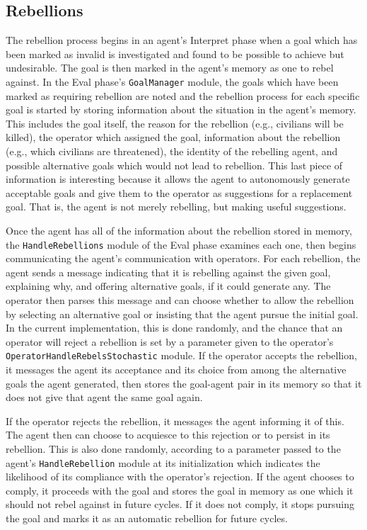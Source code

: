 \documentclass[letterpaper,11pt]{article}
\newcommand{\code}[1]{\texttt{#1}}
\begin{document}
	\subsection{Rebellions}
	The rebellion process begins in an agent's Interpret phase when a goal which has been marked as invalid is investigated and found to be possible to achieve but undesirable. The goal is then marked in the agent's memory as one to rebel against. In the Eval phase's \code{GoalManager} module, the goals which have been marked as requiring rebellion are noted and the rebellion process for each specific goal is started by  storing information about the situation in the agent's memory. This includes the goal itself, the reason for the rebellion (e.g., civilians will be killed), the operator which assigned the goal, information about the rebellion (e.g., which civilians are threatened), the identity of the rebelling agent, and possible alternative goals which would not lead to rebellion. This last piece of information is interesting because it allows the agent to autonomously generate acceptable goals and give them to the operator as suggestions for a replacement goal. That is, the agent is not merely rebelling, but making useful suggestions. \par
	
	Once the agent has all of the information about the rebellion stored in memory, the \code{HandleRebellions} module of the Eval phase examines each one, then begins communicating the agent's communication with operators. For each rebellion, the agent sends a message indicating that it is rebelling against the given goal, explaining why, and offering alternative goals, if it could generate any. The operator then parses this message and can choose whether to allow the rebellion by selecting an alternative goal or insisting that the agent pursue the initial goal. In the current implementation, this is done randomly, and the chance that an operator will reject a rebellion is set by a parameter given to the operator's \code{OperatorHandleRebelsStochastic} module. If the operator accepts the rebellion, it messages the agent its acceptance and its choice from among the alternative goals the agent generated, then stores the goal-agent pair in its memory so that it does not give that agent the same goal again. \par
	
	If the operator rejects the rebellion, it messages the agent informing it of this. The agent then can choose to acquiesce to this rejection or to persist in its rebellion. This is also done randomly, according to a parameter passed to the agent's \code{HandleRebellion} module at its initialization which indicates the likelihood of its compliance with the operator's rejection. If the agent chooses to comply, it proceeds with the goal and stores the goal in memory as one which it should not rebel against in future cycles. If it does not comply, it stops pursuing the goal and marks it as an automatic rebellion for future cycles. \par
	
\end{document}
